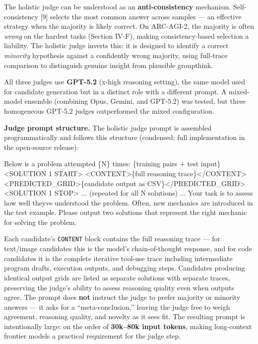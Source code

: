 \documentclass[conference]{IEEEtran}
\newenvironment{Shaded}{}{}
\newcommand{\NormalTok}[1]{#1}
\renewenvironment{Shaded}{\begin{snugshade}}{\end{snugshade}}
\begin{document}
The holistic judge can be understood as an \textbf{anti-consistency}
mechanism. Self-consistency {[}9{]} selects the most common answer
across samples --- an effective strategy when the majority is likely
correct. On ARC-AGI-2, the majority is often \emph{wrong} on the hardest
tasks (Section IV-F), making consistency-based selection a liability.
The holistic judge inverts this: it is designed to identify a correct
\emph{minority} hypothesis against a confidently wrong majority, using
full-trace comparison to distinguish genuine insight from plausible
groupthink.

All three judges use \textbf{GPT-5.2} (x-high reasoning setting), the
same model used for candidate generation but in a distinct role with a
different prompt. A mixed-model ensemble (combining Opus, Gemini, and
GPT-5.2) was tested, but three homogeneous GPT-5.2 judges outperformed
the mixed configuration.

\textbf{Judge prompt structure.} The holistic judge prompt is assembled
programmatically and follows this structure (condensed; full
implementation in the open-source release):

\begin{Shaded}
\begin{Highlighting}[]
\NormalTok{Below is a problem attempted \{N\} times:}
\NormalTok{\{training pairs + test input\}}
\NormalTok{\textless{}SOLUTION 1 START\textgreater{}}
\NormalTok{\textless{}CONTENT\textgreater{}\{full reasoning trace\}\textless{}/CONTENT\textgreater{}}
\NormalTok{\textless{}PREDICTED\_GRID\textgreater{}\{candidate output as CSV\}\textless{}/PREDICTED\_GRID\textgreater{}}
\NormalTok{\textless{}SOLUTION 1 STOP\textgreater{}}
\NormalTok{... (repeated for all N solutions) ...}
\NormalTok{Your task is to assess how well they\textquotesingle{}ve understood the}
\NormalTok{problem. Often, new mechanics are introduced in the test}
\NormalTok{example. Please output two solutions that represent the}
\NormalTok{right mechanic for solving the problem.}
\end{Highlighting}
\end{Shaded}

Each candidate's \texttt{CONTENT} block contains the full reasoning
trace --- for text/image candidates this is the model's chain-of-thought
response, and for code candidates it is the complete iterative tool-use
trace including intermediate program drafts, execution outputs, and
debugging steps. Candidates producing identical output grids are listed
as separate solutions with separate traces, preserving the judge's
ability to assess reasoning quality even when outputs agree. The prompt
does \textbf{not} instruct the judge to prefer majority or minority
answers --- it asks for a ``meta-conclusion,'' leaving the judge free to
weigh agreement, reasoning quality, and novelty as it sees fit. The
resulting prompt is intentionally large: on the order of
\textbf{30k--80k input tokens}, making long-context frontier models a
practical requirement for the judge step.
\end{document}
